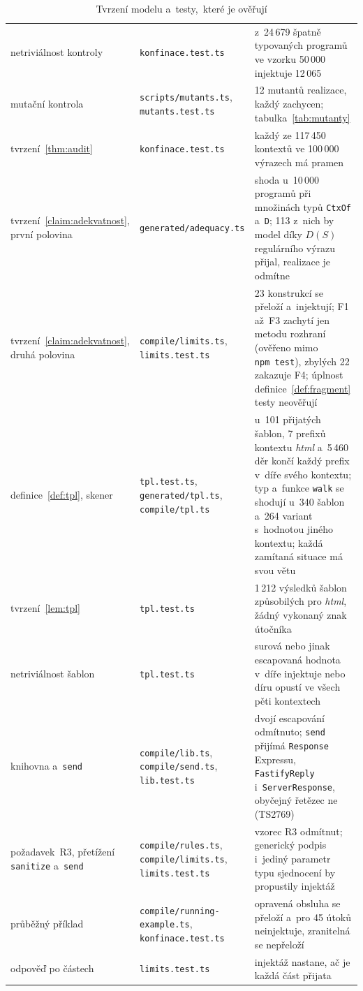 \begin{table}[htbp]
\begin{tabularx}{\textwidth}{@{}>{\raggedright\arraybackslash}p{2.9cm}>{\raggedright\arraybackslash}p{4.2cm}Y@{}}
        netriviálnost kontroly & \texttt{konfinace.test.ts} & z~24\,679 špatně typovaných programů ve vzorku 50\,000 injektuje 12\,065 \\
        mutační kontrola & \texttt{scripts/mutants.ts}, \texttt{mutants.test.ts} & 12 mutantů realizace, každý zachycen; tabulka~\ref{tab:mutanty} \\
        tvrzení~\ref{thm:audit} & \texttt{konfinace.test.ts} & každý ze 117\,450 kontextů ve 100\,000 výrazech má pramen \\
        tvrzení~\ref{claim:adekvatnost}, první polovina & \texttt{generated/adequacy.ts} & shoda u~10\,000 programů při množinách typů \texttt{CtxOf} a~\texttt{D}; 113 z~nich by model díky $D(S)$ regulárního výrazu přijal, realizace je odmítne \\
        tvrzení~\ref{claim:adekvatnost}, druhá polovina & \texttt{compile/limits.ts}, \texttt{limits.test.ts} & 23 konstrukcí se přeloží a~injektují; F1 až~F3 zachytí jen metodu rozhraní (ověřeno mimo \texttt{npm~test}), zbylých 22 zakazuje F4; úplnost definice~\ref{def:fragment} testy neověřují \\
        definice~\ref{def:tpl}, skener & \texttt{tpl.test.ts}, \texttt{generated/tpl.ts}, \texttt{compile/tpl.ts} & u~101 přijatých šablon, 7 prefixů kontextu \emph{html} a~5\,460 děr končí každý prefix v~díře svého kontextu; typ a~funkce \texttt{walk} se shodují u~340 šablon a~264 variant s~hodnotou jiného kontextu; každá zamítaná situace má svou větu \\
        tvrzení~\ref{lem:tpl} & \texttt{tpl.test.ts} & 1\,212 výsledků šablon způsobilých pro \emph{html}, žádný vykonaný znak útočníka \\
        netriviálnost šablon & \texttt{tpl.test.ts} & surová nebo jinak escapovaná hodnota v~díře injektuje nebo díru opustí ve všech pěti kontextech \\
        knihovna a~\texttt{send} & \texttt{compile/lib.ts}, \texttt{compile/send.ts}, \texttt{lib.test.ts} & dvojí escapování odmítnuto; \texttt{send} přijímá \texttt{Response} Expressu, \texttt{FastifyReply} i~\texttt{ServerResponse}, obyčejný řetězec ne (TS2769) \\
        požadavek~R3, přetížení \texttt{sanitize} a~\texttt{send} & \texttt{compile/rules.ts}, \texttt{compile/limits.ts}, \texttt{limits.test.ts} & vzorec R3 odmítnut; generický podpis i~jediný parametr typu sjednocení by propustily injektáž \\
        průběžný příklad & \texttt{compile/\allowbreak running-example.ts}, \texttt{konfinace.test.ts} & opravená obsluha se přeloží a~pro 45 útoků neinjektuje, zranitelná se nepřeloží \\
        odpověď po částech & \texttt{limits.test.ts} & injektáž nastane, ač je každá část přijata \\
        \bottomrule
    \end{tabularx}
    \caption{Tvrzení modelu a~testy,~které je ověřují}
    \label{tab:own-work}
\end{table}

